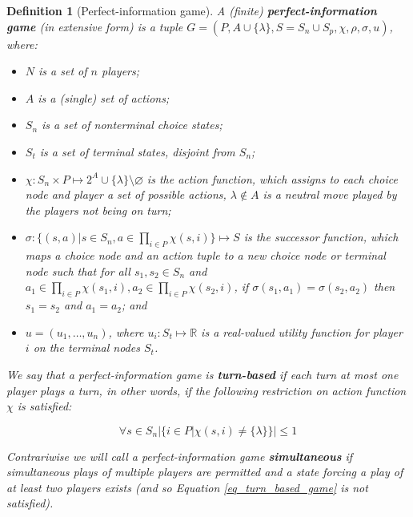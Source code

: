 \newtheorem*{defgpig}{Definition}
\begin{defgpig}[Perfect-information game]

A (finite) \textbf{perfect-information game} (in extensive form) is a tuple $G =
(P,A\cup\{\lambda\},S=S_n\cup S_p,\chi,\rho,\sigma,u)$, where:

\begin{itemize}

\item $N$ is a set of $n$ players;

\item $A$ is a (single) set of actions;

\item $S_n$ is a set of nonterminal choice states;

\item $S_t$ is a set of terminal states, disjoint from $S_n$;

\item $\chi: S_n \times P \mapsto 2^A \cup \{\lambda\} \setminus \varnothing$ is the action 
 function, which assigns to each choice node and player a set of possible actions, $\lambda \notin
 A$ is a neutral move played by the players not being on turn;

\item $\sigma: \{(s,a)| s \in S_n, a \in \prod\limits_{i\in P}\chi(s,i)\} \mapsto S$ is the
successor function, which maps a choice node and an action tuple to a new choice node or
terminal node such that for all $s_1, s_2 \in S_n$ and $a_1 \in \prod\limits_{i\in
P}\chi(s_1,i), a_2 \in \prod\limits_{i\in P}\chi(s_2,i)$, if 
$\sigma(s_1,a_1) = \sigma(s_2,a_2)$ then $s_1=s_2$ and $a_1=a_2$; and

\item $u = (u_1,\ldots,u_n)$, where $u_i: S_t \mapsto \mathbb{R}$ is a real-valued utility
function for player $i$ on the terminal nodes $S_t$.

\end{itemize}

We say that a perfect-information game is \textbf{turn-based} if each turn at most one player plays a
turn, in other words, if the following restriction on action function $\chi$ is satisfied:

\begin{equation}
\label{eq_turn_based_game}
\forall s \in S_n |\{i \in P|\chi(s,i) \not= \{\lambda\}\}| \le 1
\end{equation}

Contrariwise we will call a perfect-information game \textbf{simultaneous} if simultaneous
plays of multiple players are permitted and a state forcing a play of at least two players
exists (and so Equation \ref{eq_turn_based_game} is not satisfied).

\end{defgpig}

